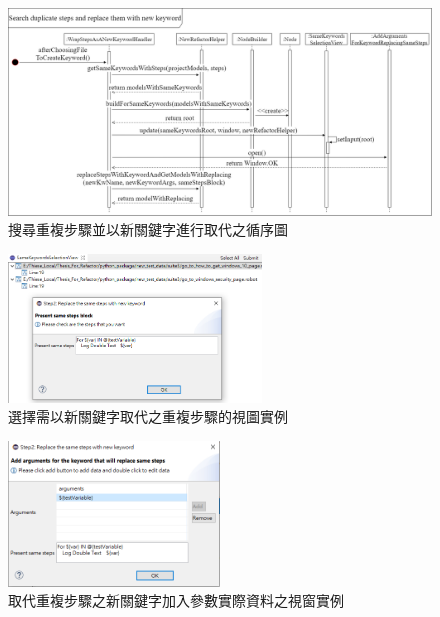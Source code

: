 \begin{figure}[H]
	\centering
    \includegraphics[width=1.0\textwidth]{picture/ch4/sequenceDiagram/Search_duplicate_steps_and_replace_sequence_diagram_in_eclipse.png}
    \caption{搜尋重複步驟並以新關鍵字進行取代之循序圖}
    \label{f4.12}
\end{figure}

\begin{figure}[H]
	\centering
    \includegraphics[width=0.6\textwidth]{picture/ch4/replace_duplicate_steps_with_new_keyword_view.PNG}
    \caption{選擇需以新關鍵字取代之重複步驟的視圖實例}
    \label{f4.13}
\end{figure}

\begin{figure}[H]
	\centering
    \includegraphics[width=0.5\textwidth]{picture/ch4/add_argument_for_keyword_replacing_duplicate_steps_dialog.png}
    \caption{取代重複步驟之新關鍵字加入參數實際資料之視窗實例}
    \label{f4.14}
\end{figure}

